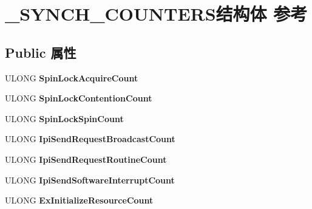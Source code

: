\hypertarget{struct___s_y_n_c_h___c_o_u_n_t_e_r_s}{}\section{\+\_\+\+S\+Y\+N\+C\+H\+\_\+\+C\+O\+U\+N\+T\+E\+R\+S结构体 参考}
\label{struct___s_y_n_c_h___c_o_u_n_t_e_r_s}
\subsection*{Public 属性}
\begin{DoxyCompactItemize}
\item 
\mbox{\label{struct___s_y_n_c_h___c_o_u_n_t_e_r_s_ae66814759321602420cc3ea43cbfc67b}} 
U\+L\+O\+NG {\bfseries Spin\+Lock\+Acquire\+Count}
\item 
\mbox{\label{struct___s_y_n_c_h___c_o_u_n_t_e_r_s_a65e61e6f59a5ffd0659bf3ebd3012063}} 
U\+L\+O\+NG {\bfseries Spin\+Lock\+Contention\+Count}
\item 
\mbox{\label{struct___s_y_n_c_h___c_o_u_n_t_e_r_s_aba58fef84e7146e47ad078f2d5fbbb46}} 
U\+L\+O\+NG {\bfseries Spin\+Lock\+Spin\+Count}
\item 
\mbox{\label{struct___s_y_n_c_h___c_o_u_n_t_e_r_s_a4dc3be18c9385e045e7a566c528e4254}} 
U\+L\+O\+NG {\bfseries Ipi\+Send\+Request\+Broadcast\+Count}
\item 
\mbox{\label{struct___s_y_n_c_h___c_o_u_n_t_e_r_s_a934e49ec10a7db81fe60a800da7c442e}} 
U\+L\+O\+NG {\bfseries Ipi\+Send\+Request\+Routine\+Count}
\item 
\mbox{\label{struct___s_y_n_c_h___c_o_u_n_t_e_r_s_ac208dbfe452647030eec0d9b42c087c4}} 
U\+L\+O\+NG {\bfseries Ipi\+Send\+Software\+Interrupt\+Count}
\item 
\mbox{\label{struct___s_y_n_c_h___c_o_u_n_t_e_r_s_a0cd2d682f64dcc472087acd3f742cf0c}} 
U\+L\+O\+NG {\bfseries Ex\+Initialize\+Resource\+Count}

\end{DoxyCompactItemize}
